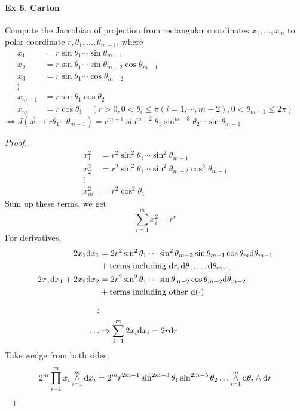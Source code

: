 	\paragraph{Ex 6. Carton} Compute the Jaccobian of projection from rectangular coordinates $x_1, \dots ,x_m$ to polar coordinate $r , \theta_1,\dots,\theta_{m-1}$, where 
	\begin{align*}
		x_1 &= r\sin \theta_1 \cdots\sin \theta_{m-1}\\
		x_2 &=r\sin\theta_1 \cdots\sin \theta_{m-2}\cos \theta_{m-1}\\
		x_3 &=r\sin\theta_1\cdots\cos \theta_{m-2}\\
		\vdots\\
		x_{m-1} &= r\sin\theta_1\cos\theta_2\\
		x_m &=r\cos\theta_1 \quad(r>0,0<\theta_i\leq \pi (i=1,\cdots,m-2), 0<\theta_{m-1}\leq 2\pi)
	\end{align*}
	$\Rightarrow J(\vec{x}\to r\theta_1\cdots\theta_{m-1})=r^{m-1}\sin^{m-2}\theta_1 \sin^{m-3}\theta_2 \cdots \sin\theta_{m-1}$
	
	\begin{proof}
		\begin{align*}
			x_1^2 &= r^2\sin^2\theta_1\cdots \sin^2\theta_{m-1}\\
			x_2^2 &=r^2\sin^2\theta_1\cdots \sin^2\theta_{m-2}\cos^2\theta_{m-1}\\
			\vdots\\
			x_m^2 &= r^2\cos^2\theta_1
		\end{align*}
	Sum up these terms, we get
	$$\sum_{i=1}^{m}x_i^2 = r^r$$
	For derivatives,
	\begin{align*}
		2x_1\mathrm{d} x_1 &= 2r^2\sin^2\theta_1 \cdots \sin^2\theta_{m-2}\sin\theta_{m-1}\cos\theta_m \mathrm{d} \theta_{m-1}\\
			&+ \text{terms including } \mathrm{d} r,\mathrm{d}\theta_1,\dots\mathrm{d}\theta_{m-1}\\
		2x_1\mathrm{d} x_1 + 2x_2\mathrm{d} x_2 &= 2r^2\sin^2\theta_1 \cdots \sin\theta_{m-2}\cos\theta_{m-2}\mathrm{d} \theta_{m-2}\\
			& + \text{terms including other }\mathrm{d} (\cdot)\\
			\vdots\\
		\dots& \Rightarrow \sum_{i=1}^{m}2x_i\mathrm{d} x_i = 2r\mathrm{d} r\\
	\end{align*} 
	Take wedge from both sides,
	$$2^m \prod_{i=1}^{m}x_i \mathop{\wedge}\limits_{i=1}^{m}\mathrm{d} x_i = 2^m r^{2m-1}\sin^{2m-3}\theta_1\sin^{2m-5}\theta_2\dots\mathop{\wedge}\limits_{i=1}^{m}\mathrm{d}\theta_i\wedge\mathrm{d} r$$
	\end{proof}
	

